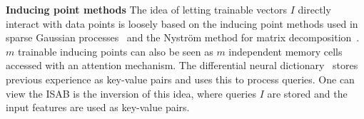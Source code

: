 \textbf{Inducing point methods} \hspace{1pt}
The idea of letting trainable vectors $I$ directly interact with data points is loosely based on the inducing point methods used in sparse Gaussian processes~\citep{Snelson2005} and the Nystr\"{o}m method for matrix decomposition~\citep{Fowlkes2004}.
$m$ trainable inducing points can also be seen as $m$ independent memory cells accessed with an attention mechanism.
The differential neural dictionary~\citep{Pritzel2017} stores previous experience as key-value pairs and uses this to process queries.
One can view the ISAB is the inversion of this idea, where queries $I$ are stored and the input features are used as key-value pairs.

